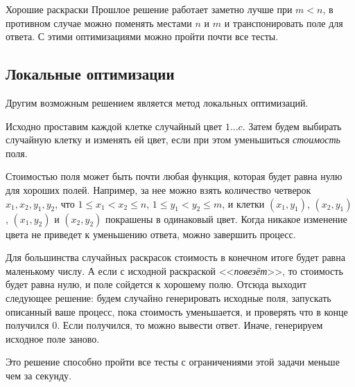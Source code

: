 \begin{tutorial}{Хорошие раскраски}
Прошлое решение работает заметно лучше при $m<n$, в противном случае можно поменять местами $n$ и $m$ и транспонировать поле для ответа. С этими оптимизациями можно пройти почти все тесты.

\subsection*{Локальные оптимизации}
Другим возможным решением является метод локальных оптимизаций.

Исходно проставим каждой клетке случайный цвет $1 \ldots c$. Затем будем выбирать случайную клетку и изменять ей цвет, если при этом уменьшиться \textit{стоимость} поля.

Стоимостью поля может быть почти любая функция, которая будет равна нулю для хороших полей. Например, за нее можно взять количество четверок $x_1, x_2, y_1, y_2$, что $1 \leq x_1 < x_2 \leq n$, $1 \leq y_1 < y_2 \leq m$, и клетки $(x_1, y_1)$, $(x_2, y_1)$, $(x_1, y_2)$ и $(x_2, y_2)$ покрашены в одинаковый цвет.
Когда никакое изменение цвета не приведет к уменьшению ответа, можно завершить процесс.

Для большинства случайных раскрасок стоимость в конечном итоге будет равна маленькому числу. А если с исходной раскраской <<\textit{повезёт}>>, то стоимость будет равна нулю, и поле сойдется к хорошему полю.
Отсюда выходит следующее решение: будем случайно генерировать исходные поля, запускать описанный ваше процесс, пока стоимость уменьшается, и проверять что в конце получился $0$. Если получился, то можно вывести ответ. Иначе, генерируем исходное поле заново.

Это решение способно пройти все тесты с ограничениями этой задачи меньше чем за секунду.


\end{tutorial}
